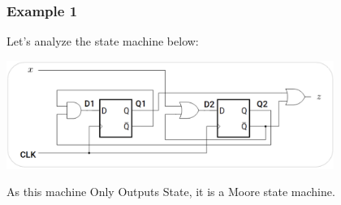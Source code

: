 \documentclass[12pt,openany]{book}
\begin{document}
\subsubsection{Example 1}
Let's analyze the state machine below: \newline
\begin{center}
	\includegraphics[width=0.8\textwidth]{circuits/13.2.png}
\end{center}
As this machine Only Outputs State, it is a Moore state machine.\newline 
\newpage
\end{document}
